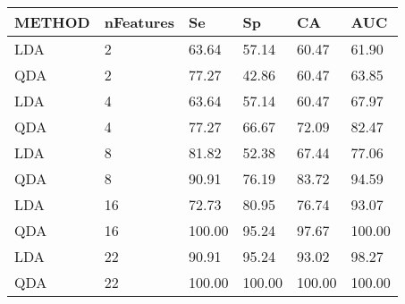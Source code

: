 \begin{table}[!ht]
    \centering
    \begin{tabular}{|l|l|l|l|l|l|}
    \hline
        METHOD & nFeatures & Se & Sp & CA & AUC \\ \hline
        LDA & 2 & 63.64 & 57.14 & 60.47 & 61.90 \\ \hline
        QDA & 2 & 77.27 & 42.86 & 60.47 & 63.85 \\ \hline
        LDA & 4 & 63.64 & 57.14 & 60.47 & 67.97 \\ \hline
        QDA & 4 & 77.27 & 66.67 & 72.09 & 82.47 \\ \hline
        LDA & 8 & 81.82 & 52.38 & 67.44 & 77.06 \\ \hline
        QDA & 8 & 90.91 & 76.19 & 83.72 & 94.59 \\ \hline
        LDA & 16 & 72.73 & 80.95 & 76.74 & 93.07 \\ \hline
        QDA & 16 & 100.00 & 95.24 & 97.67 & 100.00 \\ \hline
        LDA & 22 & 90.91 & 95.24 & 93.02 & 98.27 \\ \hline
        QDA & 22 & 100.00 & 100.00 & 100.00 & 100.00 \\ \hline
    \end{tabular}
\end{table}